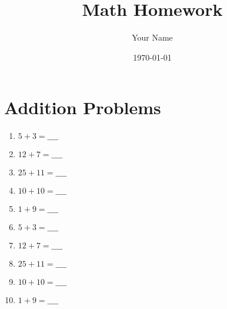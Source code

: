 \documentclass{article}
\title{Math Homework}
\author{Your Name}
\date{\today}
\begin{document}
\maketitle

\section*{Addition Problems}

\begin{enumerate}
    \item $5 + 3 = \_\_\_\_$
    \item $12 + 7 = \_\_\_\_$
    \item $25 + 11 = \_\_\_\_$
    \item $10 + 10 = \_\_\_\_$
    \item $1 + 9 = \_\_\_\_$
    \item $5 + 3 = \_\_\_\_$
    \item $12 + 7 = \_\_\_\_$
    \item $25 + 11 = \_\_\_\_$
    \item $10 + 10 = \_\_\_\_$
    \item $1 + 9 = \_\_\_\_$
\end{enumerate}
\end{document}
